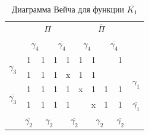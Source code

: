 \documentclass[a4paper,14pt]{article}
\begin{document}
\begin{table}[H]
	\begin{center}
		\caption{\label{tab:dvKorrNK1} Диаграмма Вейча для функции $\overline{K_1}$}
	\begin{tabular}{cccccccccc}
		& \multicolumn{4}{c}{$\Pi$}                                                                             & \multicolumn{4}{c}{$\overline{\Pi}$}                                                                            &                     \\
		& \multicolumn{2}{c}{$\gamma_4$}                          & \multicolumn{2}{c}{$\overline{\gamma_4}$}                         & \multicolumn{2}{c}{$\gamma_4$}                          & \multicolumn{2}{c}{$\overline{\gamma_4}$}                         &                     \\ \cline{2-9}
		\multicolumn{1}{c|}{\multirow{2}{*}{$\gamma_3$}}  & \multicolumn{1}{c|}{1} & \multicolumn{1}{c|}{1} & \multicolumn{1}{c|}{1} & \multicolumn{1}{c|}{1} & \multicolumn{1}{c|}{1} & \multicolumn{1}{c|}{1} & \multicolumn{1}{c|}{}  & \multicolumn{1}{c|}{1} &                  \\ \cline{2-9}
		\multicolumn{1}{c|}{}                     & \multicolumn{1}{c|}{1} & \multicolumn{1}{c|}{1} & \multicolumn{1}{c|}{1} & \multicolumn{1}{c|}{x} & \multicolumn{1}{c|}{1} & \multicolumn{1}{c|}{1} & \multicolumn{1}{c|}{}  & \multicolumn{1}{c|}{}  & \multirow{2}{*}{$\gamma_1$} \\ \cline{2-9}
		\multicolumn{1}{c|}{\multirow{2}{*}{$\overline{\gamma_3}$}} & \multicolumn{1}{c|}{1} & \multicolumn{1}{c|}{1} & \multicolumn{1}{c|}{1} & \multicolumn{1}{c|}{1} & \multicolumn{1}{c|}{x} & \multicolumn{1}{c|}{1} & \multicolumn{1}{c|}{1} & \multicolumn{1}{c|}{1} &                     \\ \cline{2-9}
		\multicolumn{1}{c|}{}                     & \multicolumn{1}{c|}{1} & \multicolumn{1}{c|}{1} & \multicolumn{1}{c|}{1} & \multicolumn{1}{c|}{1} & \multicolumn{1}{c|}{}  & \multicolumn{1}{c|}{x} & \multicolumn{1}{c|}{1} & \multicolumn{1}{c|}{1} & $\overline{\gamma_1}$                 \\ \cline{2-9}
		& $\overline{\gamma_2}$                    & \multicolumn{2}{c}{$\gamma_2$}                          & \multicolumn{2}{c}{$\overline{\gamma_2}$}                         & \multicolumn{2}{c}{$\gamma_2$}                          & $\overline{\gamma_2}$                    &                    
	\end{tabular}
\end{center}
\end{table}
\end{document}
